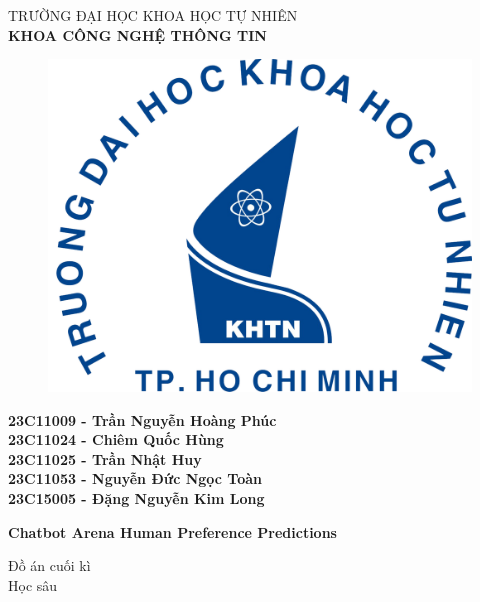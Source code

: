 \begin{titlepage}

\begin{center}
TRƯỜNG ĐẠI HỌC KHOA HỌC TỰ NHIÊN\\
\textbf{KHOA CÔNG NGHỆ THÔNG TIN}\\[2cm]


\begin{figure}[h]
    \centering
    \includegraphics[width=0.3\linewidth]{images/logo-khtn.png}
\end{figure}

{ \large \bfseries
    23C11009 - Trần Nguyễn Hoàng Phúc \\
    23C11024 - Chiêm Quốc Hùng \\
    23C11025 - Trần Nhật Huy \\
    23C11053 - Nguyễn Đức Ngọc Toàn \\
    23C15005 - Đặng Nguyễn Kim Long
\\[1cm] } 


{ \Large \bfseries Chatbot Arena Human Preference Predictions \\[1.5cm]}


\large Đồ án cuối kì\\
\large Học sâu\\




\end{center}
\end{titlepage}
